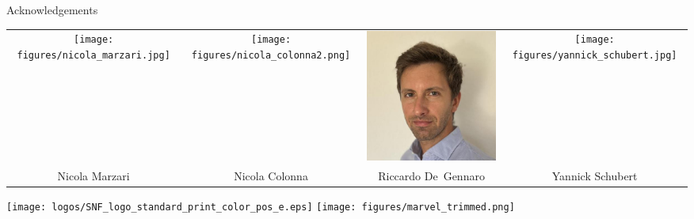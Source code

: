 \documentclass[xcolor=table,aspectratio=169]{beamer}
\numberwithin{equation}{section}
\begin{document}
\begingroup
{}
\begin{frame}{Acknowledgements}
   \begin{center}
      \footnotesize
      \begin{tabularx}{\textwidth}{CCCC}
         \texttt{[image: figures/nicola\_marzari.jpg]}     &
         \texttt{[image: figures/nicola\_colonna2.png]}    &
         \includegraphics[height = 0.3\paperheight]{figures/riccardo_degennaro.jpeg} &
         \texttt{[image: figures/yannick\_schubert.jpg]}     \\
         Nicola Marzari                                                             &
         Nicola Colonna                                                             &
         Riccardo De~Gennaro                                                        &
         Yannick Schubert                                                             \\
      \end{tabularx}
   \end{center}
   \begin{center}
      \texttt{[image: logos/SNF\_logo\_standard\_print\_color\_pos\_e.eps]}
      \hspace{1em}
      \texttt{[image: figures/marvel\_trimmed.png]}
   \end{center}


\end{frame}
\end{document}
